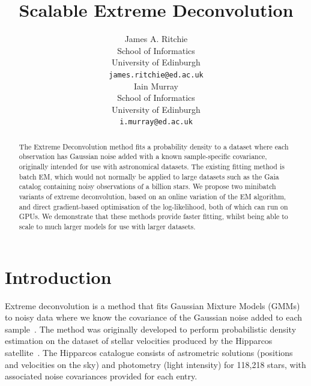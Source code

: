 \documentclass{article}
\title{Scalable Extreme Deconvolution}
\author{
  James A. Ritchie\\
  School of Informatics\\
  University of Edinburgh\\
   \texttt{james.ritchie@ed.ac.uk} \\
  \And
  Iain Murray\\
  School of Informatics\\
  University of Edinburgh\\
   \texttt{i.murray@ed.ac.uk} \\
}
\begin{document}
\maketitle

\begin{abstract}

The Extreme Deconvolution method fits a probability density to a dataset where each observation has Gaussian noise added with a known sample-specific covariance, originally intended for use with astronomical datasets.
The existing fitting method is batch EM, which would not normally be applied to large datasets such as the Gaia catalog containing noisy observations of a billion stars.
We propose two minibatch variants of extreme deconvolution, based on an online variation of the EM algorithm, and direct gradient-based optimisation of the log-likelihood, both of which can run on GPUs.
We demonstrate that these methods provide faster fitting, whilst being able to scale to much larger models for use with larger datasets.

\end{abstract}

\section{Introduction}

Extreme deconvolution is a method that fits Gaussian Mixture Models (GMMs) to noisy data where we know the covariance of the Gaussian noise added to each sample~\cite{bovyExtremeDeconvolutionInferring2011}.
The method was originally developed to perform probabilistic density estimation on the dataset of stellar velocities produced by the Hipparcos satellite~\cite{perrymanHipparcosCatalogue1997}.
The Hipparcos catalogue consists of astrometric solutions (positions and velocities on the sky) and photometry (light intensity) for 118,218 stars, with associated noise covariances provided for each entry.
\end{document}
